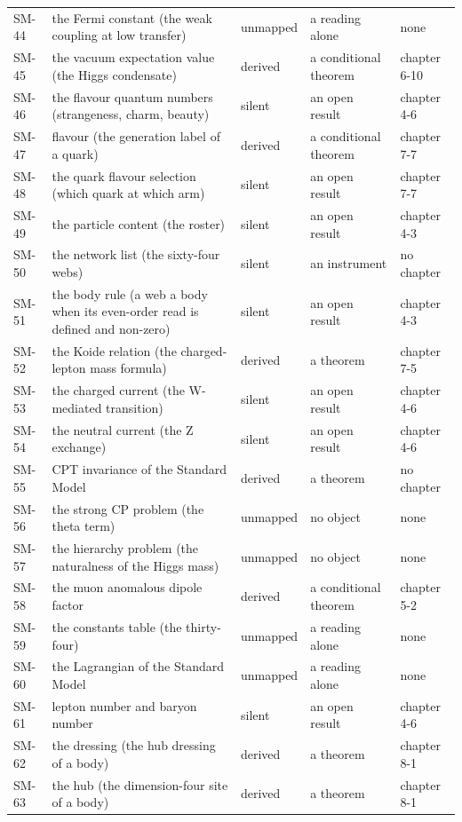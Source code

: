 {\begin{longtable}{@{}lp{58mm}llp{30mm}@{}}
SM-44 & the Fermi constant (the weak coupling at low transfer) & unmapped & a reading alone & none \\
SM-45 & the vacuum expectation value (the Higgs condensate) & derived & a conditional theorem & chapter 6-10 \\
SM-46 & the flavour quantum numbers (strangeness, charm, beauty) & silent & an open result & chapter 4-6 \\
SM-47 & flavour (the generation label of a quark) & derived & a conditional theorem & chapter 7-7 \\
SM-48 & the quark flavour selection (which quark at which arm) & silent & an open result & chapter 7-7 \\
SM-49 & the particle content (the roster) & silent & an open result & chapter 4-3 \\
SM-50 & the network list (the sixty-four webs) & silent & an instrument & no chapter \\
SM-51 & the body rule (a web a body when its even-order read is defined and non-zero) & silent & an open result & chapter 4-3 \\
SM-52 & the Koide relation (the charged-lepton mass formula) & derived & a theorem & chapter 7-5 \\
SM-53 & the charged current (the W-mediated transition) & silent & an open result & chapter 4-6 \\
SM-54 & the neutral current (the Z exchange) & silent & an open result & chapter 4-6 \\
SM-55 & CPT invariance of the Standard Model & derived & a theorem & no chapter \\
SM-56 & the strong CP problem (the theta term) & unmapped & no object & none \\
SM-57 & the hierarchy problem (the naturalness of the Higgs mass) & unmapped & no object & none \\
SM-58 & the muon anomalous dipole factor & derived & a conditional theorem & chapter 5-2 \\
SM-59 & the constants table (the thirty-four) & unmapped & a reading alone & none \\
SM-60 & the Lagrangian of the Standard Model & unmapped & a reading alone & none \\
SM-61 & lepton number and baryon number & silent & an open result & chapter 4-6 \\
SM-62 & the dressing (the hub dressing of a body) & derived & a theorem & chapter 8-1 \\
SM-63 & the hub (the dimension-four site of a body) & derived & a theorem & chapter 8-1 \\

\end{longtable}}
